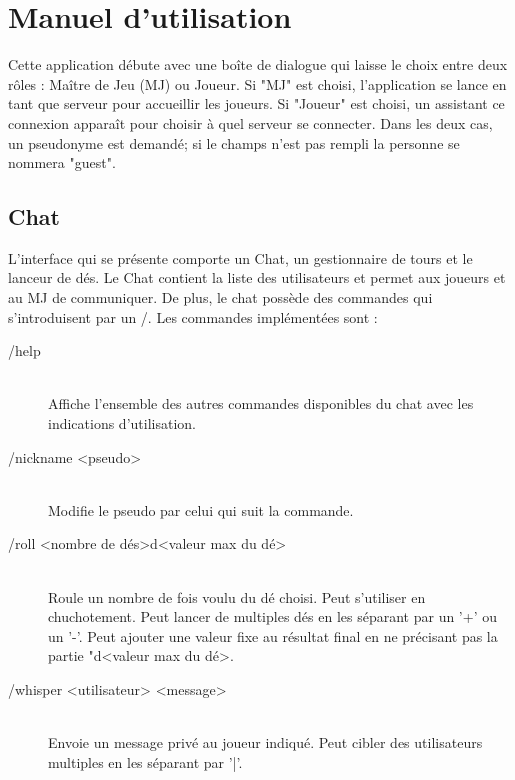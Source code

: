 \section{Manuel d'utilisation}

Cette application débute avec une boîte de dialogue qui laisse le choix entre deux rôles : Maître de Jeu (MJ) ou Joueur. Si "MJ" est choisi, l'application se lance en tant que serveur pour accueillir les joueurs. Si "Joueur" est choisi, un assistant ce connexion apparaît pour choisir à quel serveur se connecter. Dans les deux cas, un pseudonyme est demandé; si le champs n'est pas rempli la personne se nommera "guest".

\subsection{Chat}
L'interface qui se présente comporte un Chat, un gestionnaire de tours et le lanceur de dés. Le Chat contient la liste des utilisateurs et permet aux joueurs et au MJ de communiquer. De plus, le chat possède des commandes qui s'introduisent par un /. Les commandes implémentées sont :

\begin{description}
	\item[/help] \hfill \\
		Affiche l'ensemble des autres commandes disponibles du chat avec les indications d'utilisation.
	\item[/nickname <pseudo>] \hfill \\
		Modifie le pseudo par celui qui suit la commande.
	\item[/roll <nombre de dés>d<valeur max du dé>] \hfill \\
		Roule un nombre de fois voulu du dé choisi. Peut s'utiliser en chuchotement. Peut lancer de multiples dés en les séparant par un '+' ou un '-'. Peut ajouter une valeur fixe au résultat final en ne précisant pas la partie "d<valeur max du dé>.
	\item[/whisper <utilisateur> <message>] \hfill \\
		Envoie un message privé au joueur indiqué. Peut cibler des utilisateurs multiples en les séparant par '|'.
\end{description}

